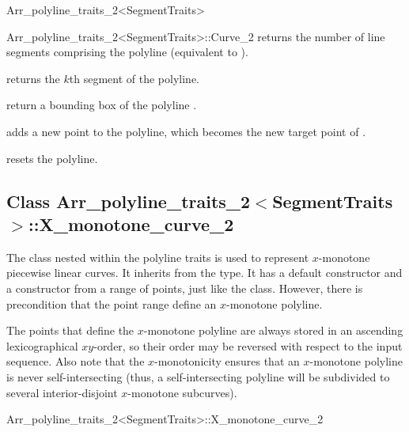 \begin{ccRefClass}{Arr_polyline_traits_2<SegmentTraits>}
\begin{ccClass}{Arr_polyline_traits_2<SegmentTraits>::Curve_2}
  {returns the number of line segments comprising the polyline
   (equivalent to ).}

  {returns the $k$th segment of the polyline.
   }

  {return a bounding box of the polyline \ccVar{}.}

\ccOperations

  {adds a new point to the polyline, which becomes the new target point
   of \ccVar{}.}

  {resets the polyline.}

\end{ccClass}

\subsection*{Class 
  Arr\_polyline\_traits\_2$<$SegmentTraits$>$::X\_monotone\_curve\_2}

The  class nested within the polyline traits is used
to represent $x$-monotone piecewise linear curves. It inherits from the
 type. It has a default constructor and a constructor from a
range of points, just like the  class. However, there is
precondition that the point range define an $x$-monotone polyline.

The points that define the $x$-monotone polyline are
always stored in an ascending lexicographical $xy$-order, so their order may
be reversed with respect to the input sequence. Also note that the
$x$-monotonicity ensures that an $x$-monotone polyline is never
self-intersecting (thus, a self-intersecting polyline will be subdivided
to several interior-disjoint $x$-monotone subcurves).

\begin{ccClass}{Arr_polyline_traits_2<SegmentTraits>::X_monotone_curve_2}
\end{ccClass}

\ccSeeAlso
    \\
    \\

\end{ccRefClass}
\ccRefPageEnd
